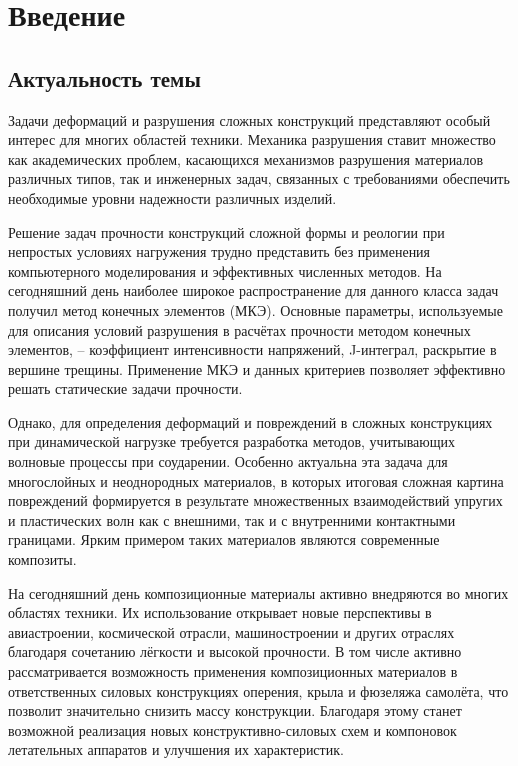 \section*{Введение}

\subsection*{Актуальность темы}

Задачи деформаций и разрушения сложных конструкций представляют особый интерес для многих областей техники. Механика разрушения ставит множество как академических проблем, касающихся механизмов разрушения материалов различных типов, так и инженерных задач, связанных с требованиями обеспечить необходимые уровни надежности различных изделий.

Решение задач прочности конструкций сложной формы и реологии при непростых условиях нагружения трудно представить без применения компьютерного моделирования и эффективных численных методов. На сегодняшний день наиболее широкое распространение для данного класса задач получил метод конечных элементов (МКЭ). Основные параметры, используемые для описания условий разрушения в расчётах прочности методом конечных элементов, -- коэффициент интенсивности напряжений, J-интеграл, раскрытие в вершине трещины. Применение МКЭ и данных критериев позволяет эффективно решать статические задачи прочности.

Однако, для определения деформаций и повреждений в сложных конструкциях при динамической нагрузке требуется разработка методов, учитывающих волновые процессы при соударении. Особенно актуальна эта задача для многослойных и неоднородных материалов, в которых итоговая сложная картина повреждений формируется в результате множественных взаимодействий упругих и пластических волн как с внешними, так и с внутренними контактными границами. Ярким примером таких материалов являются современные композиты.

На сегодняшний день композиционные материалы активно внедряются во многих областях техники. Их использование открывает новые перспективы в авиастроении, космической отрасли, машиностроении и других отраслях благодаря сочетанию лёгкости и высокой прочности. В том числе активно рассматривается возможность применения композиционных материалов в ответственных силовых конструкциях оперения, крыла и фюзеляжа самолёта, что позволит значительно снизить массу конструкции. Благодаря этому станет возможной реализация новых конструктивно-силовых схем и компоновок летательных аппаратов и улучшения их характеристик.


